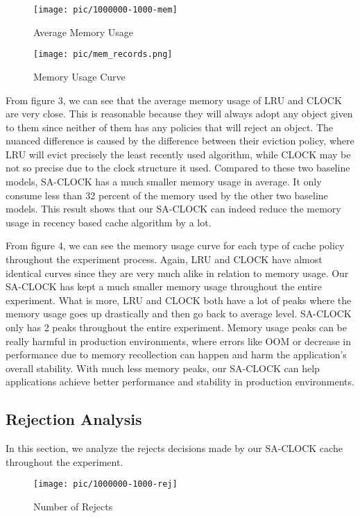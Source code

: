 \documentclass[journal,10.5pt,onecolumn]{IEEEtran}
\begin{document}
\begin{figure}[h]
\centerline{\texttt{[image: pic/1000000-1000-mem]}}
\caption{Average Memory Usage}
\label{fig}
\end{figure}

\begin{figure}[h]
\centerline{\texttt{[image: pic/mem\_records.png]}}
\caption{Memory Usage Curve}
\label{fig}
\end{figure}

From figure 3, we can see that the average memory usage of LRU and CLOCK are very close. This is reasonable because they will always adopt any object given to them since neither of them has any policies that will reject an object. The nuanced difference is caused by the difference between their eviction policy, where LRU will evict precisely the least recently used algorithm, while CLOCK may be not so precise due to the clock structure it used. Compared to these two baseline models, SA-CLOCK has a much smaller memory usage in average. It only consume less than 32 percent of the memory used by the other two baseline models. This result shows that our SA-CLOCK can indeed reduce the memory usage in recency based cache algorithm by a lot.  

From figure 4, we can see the memory usage curve for each type of cache policy throughout the experiment process. Again, LRU and CLOCK have almost identical curves since they are very much alike in relation to memory usage. Our SA-CLOCK has kept a much smaller memory usage throughout the entire experiment. What is more, LRU and CLOCK both have a lot of peaks where the memory usage goes up drastically and then go back to average level. SA-CLOCK only has 2 peaks throughout the entire experiment. Memory usage peaks can be really harmful in production environments, where errors like OOM or decrease in performance due to memory recollection can happen and harm the application's overall stability. With much less memory peaks, our SA-CLOCK can help applications achieve better performance and stability in production environments.



\subsection{Rejection Analysis}
In this section, we analyze the rejects decisions made by our SA-CLOCK cache throughout the experiment. 

\begin{figure}[h]
\centerline{\texttt{[image: pic/1000000-1000-rej]}}
\caption{Number of Rejects}
\label{fig}
\end{figure}
\end{document}
